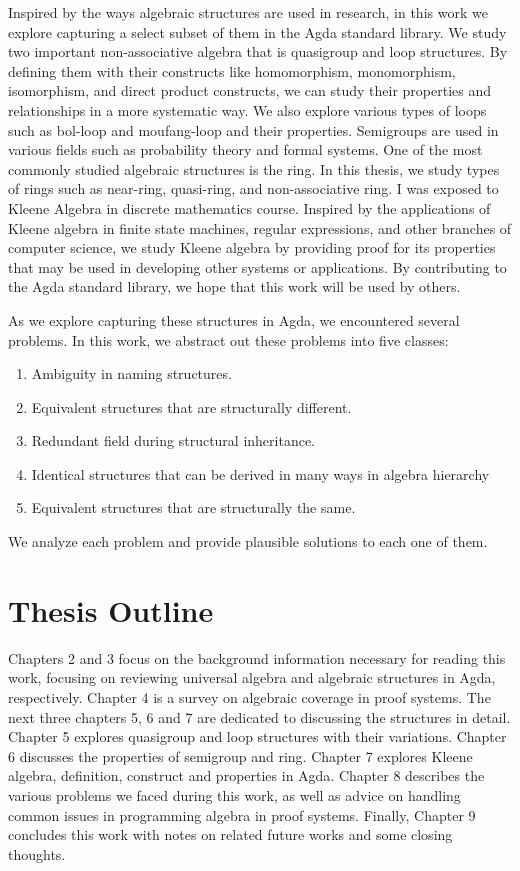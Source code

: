 Inspired by the ways algebraic structures are used in research, in this work we
explore capturing a select subset of them in the Agda standard library. We study
two important non-associative algebra that is quasigroup and loop structures. By
defining them with their constructs like homomorphism, monomorphism,
isomorphism, and direct product constructs, we can study their properties and
relationships in a more systematic way. We also explore various types of loops
such as bol-loop and moufang-loop and their properties. Semigroups are used in
various fields such as probability theory and formal systems. One of the most
commonly studied algebraic structures is the ring. In this thesis, we study
types of rings such as near-ring, quasi-ring, and non-associative ring. I was
exposed to Kleene Algebra in discrete mathematics course. Inspired by the
applications of Kleene algebra in finite state machines, regular expressions,
and other branches of computer science, we study Kleene algebra by providing
proof for its properties that may be used in developing other systems or
applications. By contributing to the Agda standard library, we hope that this
work will be used by others. 

As we explore capturing these structures in Agda, we encountered several
problems. In this work, we abstract out these problems into five classes:
\begin{enumerate}
\item Ambiguity in naming structures.
\item Equivalent structures that are structurally different.
\item Redundant field during structural inheritance.
\item Identical structures that can be derived in many ways in algebra hierarchy
\item Equivalent structures that are structurally the same.
\end{enumerate}
We analyze each problem and provide plausible solutions to each one of them.

\section{Thesis Outline}
Chapters 2 and 3 focus on the background information necessary for reading this
work, focusing on reviewing universal algebra and algebraic structures in Agda,
respectively. Chapter 4 is a survey on algebraic coverage in proof systems. The
next three chapters 5, 6 and 7 are dedicated to discussing the structures in
detail. Chapter 5 explores quasigroup and loop structures with their variations.
Chapter 6 discusses the properties of semigroup and ring. Chapter 7 explores
Kleene algebra, definition, construct and properties in Agda. Chapter 8
describes the various problems we faced during this work, as well as advice on
handling common issues in programming algebra in proof systems. Finally,
Chapter 9 concludes this work with notes on related future works and some
closing thoughts.
